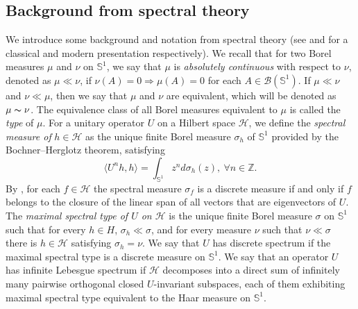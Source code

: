 \documentclass[letter, 11pt]{article}
\theoremstyle{definition}
\theoremstyle{plain}
\newcommand{\Z}{\mathbb{Z}}
\newcommand{\bS}{\mathbb{S}}
\newcommand{\1}{\mathbbm{1}}
\begin{document}
\subsection{Background from spectral theory}\label{sec-2.2}

We introduce some background and notation from spectral theory (see \cite{Auslander_Green_Hahn_flows_homogeneous:1963,Katznelson_2004} and \cite{MR2186251,Kanigowski2023} for a classical and modern presentation respectively). We recall that for two Borel measures $\mu$ and $\nu$ on $\mathbb{S}^1$, we say that $\mu$ is \textit{absolutely continuous} with respect to $\nu$, denoted as $\mu\ll \nu$, if $\nu(A)=0\Rightarrow \mu(A)=0$ for each $A\in \mathcal{B}(\mathbb{S}^1).$ If $\mu\ll \nu$ and $\nu\ll \mu$, then we say that $\mu$ and $\nu$ are equivalent, which will be denoted as $\mu\thicksim  \nu$. The equivalence class of all Borel measures equivalent to $\mu$ is called the \textit{type} of $\mu$.
For a unitary operator $U$ on a Hilbert space $\mathcal{H}$, we define the \textit{spectral measure of} $h\in \mathcal{H}$ as the unique finite Borel measure $\sigma_h$ of $\mathbb{S}^1$ provided by the Bochner–Herglotz theorem, satisfying
$$\langle U^{n}h,h\rangle =\int_{\bS^1} z^{n} d\sigma_h(z), ~\forall n\in \Z. $$
By \cite[Section 2.1]{Kanigowski2023}, for each $f\in \mathcal{H}$ the spectral measure $\sigma_f$ is a discrete measure if and only if $f$ belongs to the closure of the linear span of all vectors that are eigenvectors of $U $. The \textit{maximal spectral type of $U$ on $\mathcal{H}$} is the unique finite Borel measure $\sigma$ on $\bS^1$ such that for every $h\in H$, $\sigma_h\ll \sigma$, and for every measure $\nu$ such that $\nu\ll \sigma$ there is $h\in \mathcal{H}$ satisfying $\sigma_h=\nu$. We say that $U$ has discrete spectrum if the maximal spectral type is a discrete measure on $\bS^1$. We say that an operator $U$ has infinite Lebesgue spectrum if $\mathcal{H}$ decomposes into a direct sum of infinitely many pairwise orthogonal closed $U$-invariant subspaces, each of them exhibiting maximal spectral type equivalent to the Haar measure on $\bS^1$. 
\end{document}
